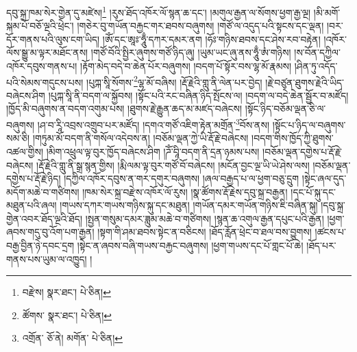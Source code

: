 དབུ་སྐྲ་ཁམ་སེར་གྱེན་དུ་མཛེས།\footnote{བརྫེས།  སྣར་ཐང་།  པེ་ཅིན། } །རུས་ཐོད་འཁོར་ལོ་སྙན་ཆ་དང་། །མགུལ་རྒྱན་ལ་སོགས་ཕྱག་རྒྱ་ལྔ། །མི་མགོ་སྐམ་པོ་བཅོ་ལྔའི་ཕྲེང་། །གཅེར་བུ་གཡོན་བརྐྱང་གར་ཐབས་བཞུགས། །གཙོ་ལ་འདུད་པའི་སྟངས་དང་ལྡན། །བར་དོར་གནས་པའི་ལུས་ངག་ཡིད། །ཨོཾ་དང་ཨཱཿ་ཧཱུྃ་དཀར་དམར་ནག །ཧོཿ་གཉིས་ཐབས་དང་ཤེས་རབ་བརྟེན། །འཁོར་ལོས་སྒྱུ་མ་ལྟར་མཐོང་ནས། །གཙོ་བོའི་སྤྱིར་ཞུགས་གཙོ་ཉིད་ཞུ། །ཡུམ་ཡང་ཞུ་ནས་ཧཱུྃ་ཨཾ་གཉིས། །ས་བོན་དཀྱིལ་འཁོར་དབུས་གནས་པ། །རྟོག་མེད་བདེ་བ་ཆེན་པོར་བཞུགས། །བདག་པོ་སྟོར་བས་ལྷ་མོ་རྣམས། །ཤིན་ཏུ་འདོད་པའི་སེམས་གདུངས་པས། །པུཀྐ་སཱི་སོགས་\footnote{ཚོགས་  སྣར་ཐང་།  པེ་ཅིན། }ལྷ་མོ་བཞིས། །རྡོ་རྗེའི་གླུ་ནི་ལེན་པར་བྱེད། །རྗེ་བཙུན་ཐུགས་རྗེའི་ཡིད་བཞེངས་ཤིག །པུཀྐ་སཱི་ནི་བདག་ལ་སྐྱོབས། །སྟོང་པའི་རང་བཞིན་ཉིད་སྤོངས་ལ། །བདག་ལ་བདེ་ཆེན་སྦྱོར་བ་མཛོད། །ཁྱོད་མི་བཞུགས་ན་བདག་འགུམ་པས། །ཐུགས་རྗེ་རྒྱུན་ཆད་མ་མཛད་བཞེངས། །སྟོང་ཉིད་བཅོམ་ལྡན་ཅི་ལ་བཞུགས། །ཤ་བ་རཱི་འབྲས་འགྲུབ་པར་མཛོད། །དགའ་གཙོ་འཇིག་རྟེན་མགྲོན་\footnote{འགྲོན་  ཅོ་ནེ། མགོན་  པེ་ཅིན། }བོས་ནས། །སྟོང་པ་ཉིད་ལ་བཞུགས་སམ་ཅི། །གཏུམ་མོ་བདག་ནི་གསོལ་འདེབས་ན། །བཅོམ་ལྡན་ཀྱེ་ཡི་རྡོ་རྗེ་བཞེངས། །བདག་གིས་ཁྱོད་ཀྱི་ཐུགས་འཚལ་གྱིས། །མིག་འཕྲུལ་ལྟ་བུར་ཁྱོད་བཞེངས་ཤིག །ཌོཾ་བཱི་བདག་ནི་དྲན་ཉམས་པས། །བཅོམ་ལྡན་དགྱེས་པ་རྡོ་རྗེ་བཞེངས། །རྡོ་རྗེའི་གླུ་ནི་སྒྲ་སྙན་གྱིས། །རྨི་ལམ་ལྟ་བུར་གཙོ་བོ་བཞེངས། །མངོན་བྱང་ལྔ་ཡི་ཡེ་ཤེས་ལས། །བཅོམ་ལྡན་དགྱེས་པ་རྡོ་རྗེ་ཉིད། །དཀྱིལ་འཁོར་དབུས་ན་གར་དགུར་བཞུགས། །ཞལ་བརྒྱད་པ་ལ་ཕྱག་བཅུ་དྲུག །སྟེང་ཞལ་དུད་མདོག་མཆེ་བ་གཙིགས། །ཁམ་སེར་སྐྲ་བརྫེས་འཁོར་ལོ་རུས། །སྣ་ཚོགས་རྡོ་རྗེས་དབུ་སྐྲ་བརྒྱན། །དང་པོ་སྐུ་དང་མཐུན་པའི་ཞལ། །གཡས་དཀར་གཡས་གཉིས་སྐུ་དང་མཐུན། །གཡོན་དམར་གཡོན་གཉིས་ཇི་བཞིན་སྐུ། །དབུ་སྐྲ་གྱེན་འབར་ཐོད་ལྔའི་ཐོད། །སྤྱན་གསུམ་དམར་ཟླུམ་མཆེ་བ་གཙིགས། །སྙན་ཆ་འགུལ་རྒྱན་དཔུང་པའི་རྒྱན། །ཕྱག་ཞབས་གདུ་བུ་འོག་པག་རྒྱན། །སྟག་གི་ཤམ་ཐབས་སྟེང་ན་བཅིངས། །ཐོད་རློན་ཕྲེང་བ་ཐལ་བས་བྱུགས། །ཚངས་པ་བརྒྱ་བྱིན་ཉེ་དབང་དྲག །སྟེང་ན་ཞབས་བཞི་གཡས་བརྐྱང་བཞུགས། །ཕྱག་གཡས་དང་པོ་གླང་པོ་ཆེ། །ཐོད་པར་གནས་པས་ཡུམ་ལ་འཁྱུད། །
